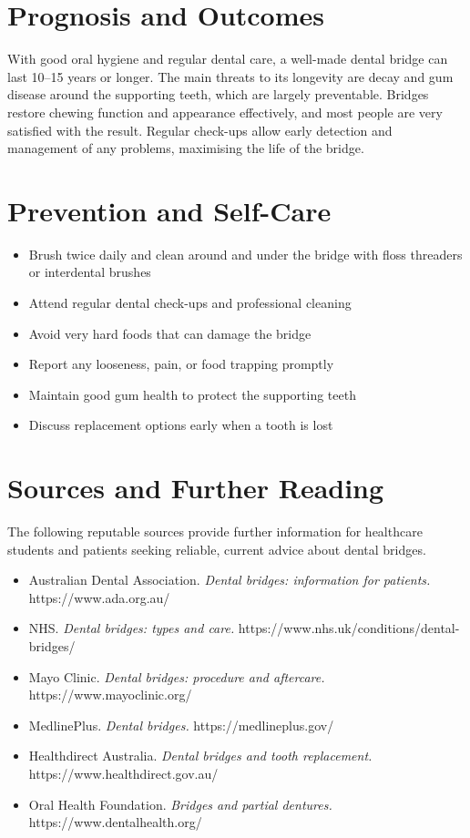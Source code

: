 \section*{Prognosis and Outcomes}
With good oral hygiene and regular dental care, a well-made dental bridge can last 10--15 years or longer. The main threats to its longevity are decay and gum disease around the supporting teeth, which are largely preventable. Bridges restore chewing function and appearance effectively, and most people are very satisfied with the result. Regular check-ups allow early detection and management of any problems, maximising the life of the bridge.

\section*{Prevention and Self-Care}
\begin{itemize}
    \item Brush twice daily and clean around and under the bridge with floss threaders or interdental brushes
    \item Attend regular dental check-ups and professional cleaning
    \item Avoid very hard foods that can damage the bridge
    \item Report any looseness, pain, or food trapping promptly
    \item Maintain good gum health to protect the supporting teeth
    \item Discuss replacement options early when a tooth is lost
\end{itemize}

\section*{Sources and Further Reading}
The following reputable sources provide further information for healthcare students and patients seeking reliable, current advice about dental bridges.

\begin{itemize}
    \item Australian Dental Association. \textit{Dental bridges: information for patients.} https://www.ada.org.au/
    \item NHS. \textit{Dental bridges: types and care.} https://www.nhs.uk/conditions/dental-bridges/
    \item Mayo Clinic. \textit{Dental bridges: procedure and aftercare.} https://www.mayoclinic.org/
    \item MedlinePlus. \textit{Dental bridges.} https://medlineplus.gov/
    \item Healthdirect Australia. \textit{Dental bridges and tooth replacement.} https://www.healthdirect.gov.au/
    \item Oral Health Foundation. \textit{Bridges and partial dentures.} https://www.dentalhealth.org/
\end{itemize}
